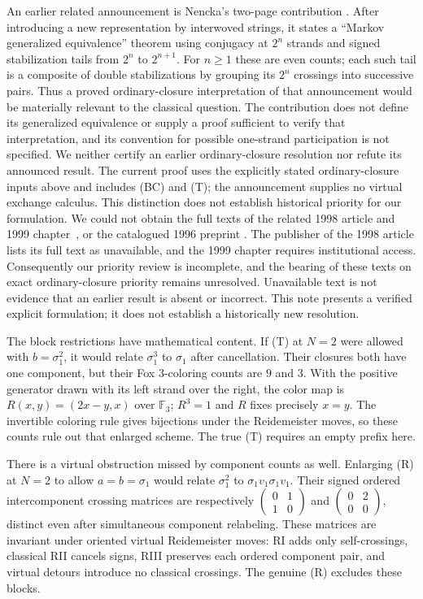 \documentclass[11pt]{article}
\newcommand{\sig}{\sigma}
\begin{document}
An earlier related announcement is Nencka's two-page contribution
\cite{Nencka}. After introducing a new representation by interwoved strings,
it states a ``Markov generalized equivalence'' theorem using conjugacy at
$2^n$ strands and signed stabilization tails from $2^n$ to $2^{n+1}$.
For $n\ge1$ these are even counts; each such tail is a composite of double
stabilizations by grouping its $2^n$ crossings into successive pairs.
Thus a proved ordinary-closure interpretation of that announcement would be
materially relevant to the classical question. The contribution does not
define its generalized equivalence or supply a proof sufficient to verify
that interpretation, and its convention for possible one-strand participation
is not specified. We neither certify an earlier ordinary-closure resolution
nor refute its announced result. The current proof uses the explicitly stated
ordinary-closure inputs above and includes (BC) and (T); the announcement
supplies no virtual exchange calculus. This distinction does not establish
historical priority for our formulation.
We could not obtain the full texts of the related 1998 article and 1999
chapter~\cite{Nencka98,Nencka99}, or the catalogued 1996 preprint
\cite{NenckaPreprint}. The publisher of the 1998 article lists its full text as
unavailable, and the 1999 chapter requires institutional access. Consequently
our priority review is incomplete, and the bearing of these texts on exact
ordinary-closure priority remains unresolved. Unavailable text is not evidence
that an earlier result is absent or incorrect. This note presents a verified
explicit formulation; it does not establish a historically new resolution.

The block restrictions have mathematical content. If (T) at $N=2$ were allowed
with $b=\sig_1^2$, it would relate $\sig_1^3$ to $\sig_1$ after cancellation.
Their closures both have one component, but their Fox $3$-coloring counts are
$9$ and $3$. With the positive generator drawn with its left strand over the right,
the color map is $R(x,y)=(2x-y,x)$ over $\mathbb F_3$; $R^3=1$ and $R$ fixes precisely $x=y$.
The invertible coloring rule gives bijections under the Reidemeister moves,
so these counts rule out that enlarged scheme. The true (T) requires an empty
prefix here.

There is a virtual obstruction missed by component counts as well. Enlarging
(R) at $N=2$ to allow $a=b=\sig_1$ would relate $\sig_1^2$ to
$\sig_1v_1\sig_1v_1$. Their signed ordered intercomponent crossing matrices are
respectively $\left(\begin{smallmatrix}0&1\\1&0\end{smallmatrix}\right)$ and
$\left(\begin{smallmatrix}0&2\\0&0\end{smallmatrix}\right)$, distinct even after
simultaneous component relabeling. These matrices are invariant under oriented
virtual Reidemeister moves: RI adds only self-crossings, classical RII cancels
signs, RIII preserves each ordered component pair, and virtual detours introduce
no classical crossings.
The genuine (R) excludes these blocks.
\end{document}
